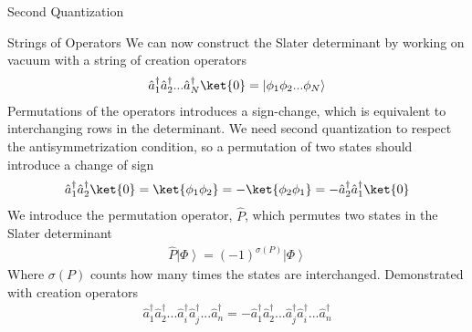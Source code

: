 \documentclass[twoside,english]{uiofysmaster}
\begin{document}
\begin{chapter}{Second Quantization}
	\begin{section}{Strings of Operators}
		We can now construct the Slater determinant by working on vacuum with a string of creation operators
		\begin{align}
			\hat a_1^{\dagger} \hat a_2^{\dagger}... \hat a_N^{\dagger} \ket{0} = \left| \phi_1 \phi_2 ... \phi_N \right>
		\end{align}
		Permutations of the operators introduces a sign-change, which is equivalent to interchanging rows in the determinant. We need second quantization to respect the antisymmetrization condition, so a permutation of two states should introduce a change of sign
		\begin{align}
			\hat a_1^{\dagger} \hat a_2^{\dagger} \ket{0} = \ket{\phi_1 \phi_2} = -\ket{\phi_2 \phi_1} = -\hat a_2^{\dagger} \hat a_1^{\dagger} \ket{0}
		\end{align}
		We introduce the permutation operator, $\hat P$, which permutes two states in the Slater determinant 
		\begin{align}
			\hat P \left| \Phi \right> = (-1)^{\sigma(P)} \left| \Phi \right>
		\end{align}
		Where $\sigma(P)$ counts how many times the states are interchanged. Demonstrated with creation operators
		\begin{align}
			\hat a_1^\dagger \hat a_2^\dagger ... \hat a_i^\dagger \hat a_j^\dagger ... \hat a_n^\dagger = - \hat a_1^\dagger \hat a_2^\dagger ... \hat a_j^\dagger \hat a_i^\dagger ... \hat a_n^\dagger
		\end{align}
	\end{section}


\end{chapter}
\end{document}

